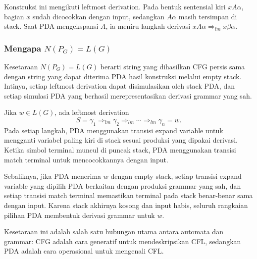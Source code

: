Konstruksi ini mengikuti leftmost derivation. Pada bentuk sentensial kiri $xA\alpha$, bagian $x$ sudah dicocokkan dengan input, sedangkan $A\alpha$ masih tersimpan di stack. Saat PDA mengekspansi $A$, ia meniru langkah derivasi $xA\alpha \Rightarrow_{lm} x\beta\alpha$.

\subsubsection{\texorpdfstring{Mengapa $N(P_G)=L(G)$}{Mengapa N(PG)=L(G)}}

\begin{jawab}
Kesetaraan $N(P_G)=L(G)$ berarti string yang dihasilkan CFG persis sama dengan string yang dapat diterima PDA hasil konstruksi melalui empty stack. Intinya, setiap leftmost derivation dapat disimulasikan oleh stack PDA, dan setiap simulasi PDA yang berhasil merepresentasikan derivasi grammar yang sah.
\end{jawab}

Jika $w\in L(G)$, ada leftmost derivation
\[
    S=\gamma_1 \Rightarrow_{lm} \gamma_2 \Rightarrow_{lm} \cdots \Rightarrow_{lm} \gamma_n=w.
\]
Pada setiap langkah, PDA menggunakan transisi expand variable untuk mengganti variabel paling kiri di stack sesuai produksi yang dipakai derivasi. Ketika simbol terminal muncul di puncak stack, PDA menggunakan transisi match terminal untuk mencocokkannya dengan input.

Sebaliknya, jika PDA menerima $w$ dengan empty stack, setiap transisi expand variable yang dipilih PDA berkaitan dengan produksi grammar yang sah, dan setiap transisi match terminal memastikan terminal pada stack benar-benar sama dengan input. Karena stack akhirnya kosong dan input habis, seluruh rangkaian pilihan PDA membentuk derivasi grammar untuk $w$.

Kesetaraan ini adalah salah satu hubungan utama antara automata dan grammar: CFG adalah cara generatif untuk mendeskripsikan CFL, sedangkan PDA adalah cara operasional untuk mengenali CFL.

